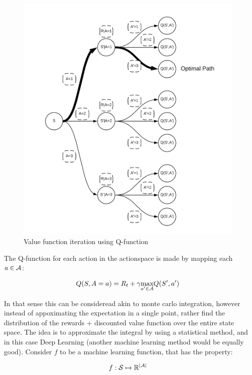 \begin{figure}[ht]
    \centering
    \includegraphics[scale=0.15]{figures/vfi_figure.png}
    \caption{Value function iteration using Q-function}
    \label{fig:vfi_figure}
\end{figure}

The Q-function for each action in the actionspace is made by mapping each $a\in \mathcal{A}$:

\begin{equation}
 Q(S, A=a) = R_t + \gamma \underset{a'\in \mathcal{A}}{\max} Q(S', a')
\end{equation}

In that sense this can be consideread akin to monte carlo integration, however instead of appoximating the expectation in a single point, rather find the distribution of the rewards + discounted value function over the entire state space. The idea is to approximate the integral by using a statistical method, and in this case Deep Learning (another machine learning method would be equally good). Consider $f$ to be a machine learning function, that has the property:

\begin{equation}
    f: \mathcal{S} \mapsto\mathbb{R}^{\mid \mathcal{A} \mid}
\end{equation}

